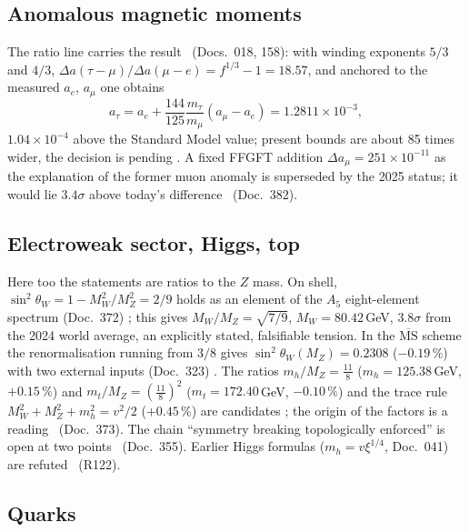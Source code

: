 \subsection{Anomalous magnetic moments}

The ratio line carries the result \KM\ (Docs.~018, 158): with winding exponents $5/3$ and $4/3$,
$\Delta a(\tau{-}\mu)/\Delta a(\mu{-}e)=f^{1/3}-1=18.57$, and anchored to the measured $a_e$,
$a_\mu$ one obtains
\begin{equation}
  a_\tau=a_e+\frac{144}{125}\frac{m_\tau}{m_\mu}(a_\mu-a_e)=1.2811\times10^{-3},
\end{equation}
$1.04\times10^{-4}$ above the Standard Model value; present bounds are about 85 times wider, the
decision is pending \SM. A fixed FFGFT addition $\Delta a_\mu=251\times10^{-11}$ as the
explanation of the former muon anomaly is superseded by the 2025 status; it would lie
$3.4\sigma$ above today's difference \XM\ (Doc.~382).

\subsection{Electroweak sector, Higgs, top}

Here too the statements are ratios to the $Z$ mass. On shell, $\sin^2\theta_W=1-M_W^2/M_Z^2=2/9$
holds as an element of the $A_5$ eight-element spectrum (Doc.~372) \KM; this gives
$M_W/M_Z=\sqrt{7/9}$, $M_W=80.42$\,GeV, $3.8\sigma$ from the 2024 world average, an explicitly
stated, falsifiable tension. In the $\overline{\text{MS}}$ scheme the renormalisation running from
$3/8$ gives $\sin^2\theta_W(M_Z)=0.2308$ ($-0.19\,\%$) with two external inputs (Doc.~323) \KM.
The ratios $m_h/M_Z=\tfrac{11}{8}$ ($m_h=125.38$\,GeV, $+0.15\,\%$) and
$m_t/M_Z=(\tfrac{11}{8})^2$ ($m_t=172.40$\,GeV, $-0.10\,\%$) and the trace rule
$M_W^2+M_Z^2+m_h^2=v^2/2$ ($+0.45\,\%$) are candidates \KM; the origin of the factors is a reading
\SM\ (Doc.~373). The chain ``symmetry breaking topologically enforced'' is open at two points
\SM\ (Doc.~355). Earlier Higgs formulas ($m_h=v\xi^{1/4}$, Doc.~041) are refuted \XM\ (R122).

\subsection{Quarks}

